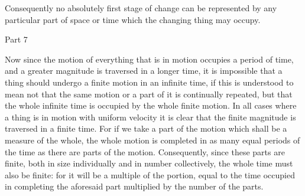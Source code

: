 Consequently no absolutely first stage of change can be represented
by any particular part of space or time which the changing thing may
occupy. 

Part 7

Now since the motion of everything that is in motion occupies a period
of time, and a greater magnitude is traversed in a longer time, it
is impossible that a thing should undergo a finite motion in an infinite
time, if this is understood to mean not that the same motion or a
part of it is continually repeated, but that the whole infinite time
is occupied by the whole finite motion. In all cases where a thing
is in motion with uniform velocity it is clear that the finite magnitude
is traversed in a finite time. For if we take a part of the motion
which shall be a measure of the whole, the whole motion is completed
in as many equal periods of the time as there are parts of the motion.
Consequently, since these parts are finite, both in size individually
and in number collectively, the whole time must also be finite: for
it will be a multiple of the portion, equal to the time occupied in
completing the aforesaid part multiplied by the number of the parts.

